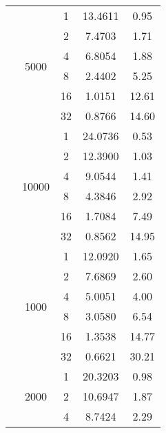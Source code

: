 \begin{tabularx}{\textwidth}{@{} c c c c c @{}}
                            & \multirow{6}{*}{5000} & 1  & 13.4611 & 0.95  \\
                            &                       & 2  & 7.4703  & 1.71  \\
                            &                       & 4  & 6.8054  & 1.88  \\
                            &                       & 8  & 2.4402  & 5.25  \\
                            &                       & 16 & 1.0151  & 12.61 \\
                            &                       & 32 & 0.8766  & 14.60 \\
                            \cmidrule{2-5}
                            & \multirow{6}{*}{10000} & 1  & 24.0736 & 0.53  \\
                            &                        & 2  & 12.3900 & 1.03  \\
                            &                        & 4  & 9.0544  & 1.41  \\
                            &                        & 8  & 4.3846  & 2.92  \\
                            &                        & 16 & 1.7084  & 7.49  \\
                            &                        & 32 & 0.8562  & 14.95 \\
\midrule\enlargethispage{-\baselineskip}
    \multirow{24}{*}{50000} & \multirow{6}{*}{1000} & 1  & 12.0920 & 1.65  \\
                            &                       & 2  & 7.6869  & 2.60  \\
                            &                       & 4  & 5.0051  & 4.00  \\
                            &                       & 8  & 3.0580  & 6.54  \\
                            &                       & 16 & 1.3538  & 14.77 \\
                            &                       & 32 & 0.6621  & 30.21 \\
                            \cmidrule{2-5}
                            & \multirow{6}{*}{2000} & 1  & 20.3203 & 0.98  \\
                            &                       & 2  & 10.6947 & 1.87  \\
                            &                       & 4  & 8.7424  & 2.29  \\

\end{tabularx}
